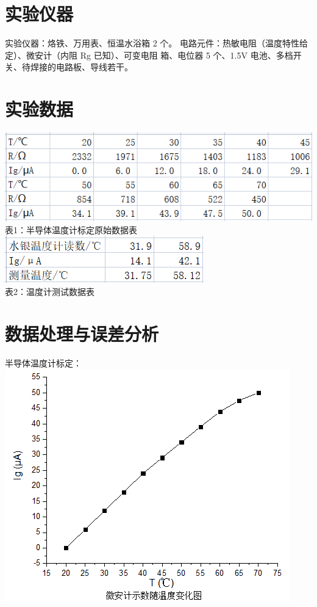 \documentclass{report}
\begin{document}
	
	\section{实验仪器}
	实验仪器：烙铁、万用表、恒温水浴箱 2 个。
	电路元件：热敏电阻（温度特性给定）、微安计（内阻 Rg 已知）、可变电阻
	箱、电位器 5 个、1.5V 电池、多档开关、待焊接的电路板、导线若干。
	\section{实验数据}
	\begin{flushleft}
		\includegraphics{2}	\\ 
		表1：半导体温度计标定原始数据表\\
		\includegraphics{3}	\\ 
		表2：温度计测试数据表
	\end{flushleft}

	\section{数据处理与误差分析}
半导体温度计标定：\\
	\includegraphics{4}
\end{document}
